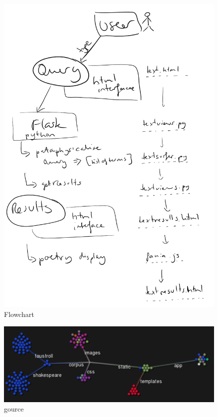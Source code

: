 \begin{figure}[!htbp] %
  \centering
  \includegraphics[width=\linewidth]{images/flow}
\caption[Flowchart]{Flowchart}
\label{img:flow}
\end{figure}

\begin{figure}[!htbp] %
  \centering
  \includegraphics[width=\linewidth]{images/gource}
\caption[gource]{gource}
\label{img:gource}
\end{figure}

